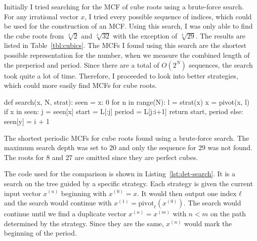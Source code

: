 Initially I tried searching for the MCF of cube roots
using a brute-force search.
For any irrational vector $x$,
I tried every possible sequence of indices,
which could be used for the construction of an MCF.
Using this search, I was only able to find the cube roots from $\sqrt[3]{2}$
and $\sqrt[3]{32}$ with the exception of $\sqrt[3]{29}$.
The results are listed in Table~\vref{tbl:cubics}.
The MCFs I found using this search are the shortest possible representation
for the number, when we measure the combined length of the preperiod and
period.
Since there are a total of $O(2^N)$ sequences,
the search took quite a lot of time.
Therefore, I proceeded to look into better strategies,
which could more easily find MCFs for cube roots.

\begin{Python}[
    float=tbp,
    numbers=left,
    caption={
      The implementation of the search for periodic MCFs.
      The strategy \texttt{strat} outputs a single index $ℓ$, which is used
      for pivoting.
      The search stops once a duplicate vector $x$ has been found and the
      program returns the preperiod and period once found.
    },
    label={lst:det-search},
  ]
def search(x, N, strat):
  seen = {x: 0}
  for n in range(N):
    l = strat(x)
    x = pivot(x, l)
    if x in seen:
      j = seen[x]
      start = L[:j]
      period = L[j:i+1]
      return start, period
    else:
      seen[y] = i + 1
\end{Python}

\begin{table}[tbp]
  \caption{
    The shortest periodic MCFs for cube roots found using a
    brute-force search. The maximum search depth was set to $20$ and
    only the sequence for $29$ was not found. The roots for $8$ and $27$ are
    omitted since they are perfect cubes.}
  \label{tbl:cubics}
  \centering
  
\end{table}

The code used for the comparison is shown in Listing~\ref{lst:det-search}.
It is a search on the tree guided by a specific strategy.
Each strategy is given the current input vector $x^{(n)}$ beginning with $x^{(0)} = x$.
It would then output one index $ℓ$ and the search would continue with
$x^{(1)} = \mathrm{pivot}_ℓ(x^{(0)})$.
The search would continue until we find a duplicate vector $x^{(n)} = x^{(m)}$
with $n < m$ on the path determined by the strategy.
Since they are the same, $x^{(n)}$ would mark the beginning of the period.

